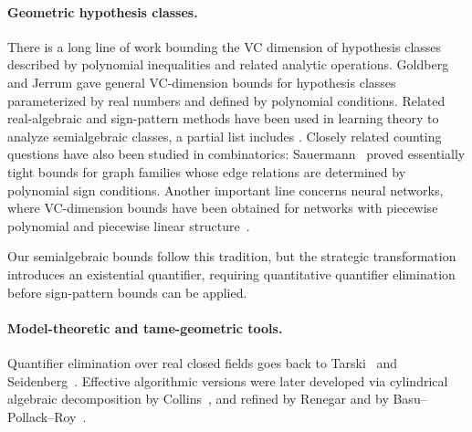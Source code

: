 \documentclass[11pt]{article}
\theoremstyle{plain}
\theoremstyle{definition}
\theoremstyle{remark}
\DeclareMathOperator{\VCdim}{\mathbb{VC}}
\begin{document}


\paragraph{Geometric hypothesis classes.} 
There is a long line of work bounding the VC dimension of hypothesis classes
described by polynomial inequalities and related analytic operations.
Goldberg and Jerrum \citep{Goldberg1995} gave general VC-dimension bounds for
hypothesis classes parameterized by real numbers and defined by polynomial
conditions. Related real-algebraic and sign-pattern methods have been used in
learning theory to analyze semialgebraic classes, a partial list includes
\citep{ben1993localization,Ben-DavidES02,AlonMY16,Alon23}. Closely related counting questions have also been studied in combinatorics:
Sauermann~\citep{SAUERMANN2021107593} proved essentially tight bounds for graph families whose edge relations are determined by polynomial sign conditions. Another important line concerns neural networks, where VC-dimension bounds have been obtained for networks with piecewise polynomial and piecewise linear structure~\citep{bartlett98,bartlett19}.


Our semialgebraic bounds follow this tradition, but the strategic transformation introduces an existential quantifier, requiring quantitative
quantifier elimination before sign-pattern bounds can be applied.



\paragraph{Model-theoretic and tame-geometric tools.}
Quantifier elimination over real closed fields goes back to
Tarski~\citep{tarski1951decision} and Seidenberg~\citep{seidenberg1954}.
Effective algorithmic versions were later developed via cylindrical algebraic
decomposition by Collins~\citep{collins1975}, and refined by Renegar
\citep{Renegar1992I,Renegar1992II,Renegar1992III} and by
Basu--Pollack--Roy~\citep{BasuPollackRoy1996,Basu1999}.
\end{document}
